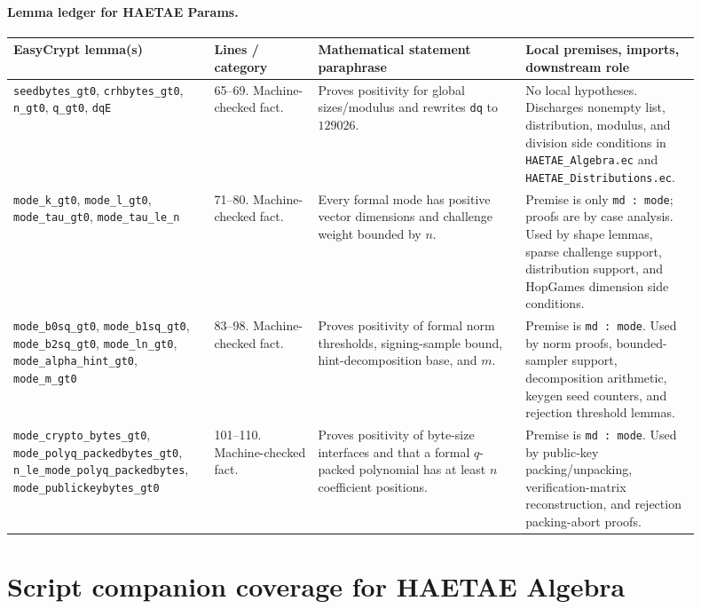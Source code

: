 \documentclass[11pt]{report}
\DeclareRobustCommand{\file}[1]{\ifmmode\text{\nolinkurl{#1}}\else\nolinkurl{#1}\fi}
\DeclareRobustCommand{\ec}[1]{\ifmmode\text{\nolinkurl{#1}}\else\nolinkurl{#1}\fi}
\theoremstyle{definition}
\theoremstyle{plain}
\begin{document}
\paragraph{Lemma ledger for HAETAE Params.}
{\footnotesize
\begin{longtable}{p{0.25\linewidth}p{0.14\linewidth}p{0.28\linewidth}p{0.23\linewidth}}
\toprule
\textbf{EasyCrypt lemma(s)} & \textbf{Lines / category} &
\textbf{Mathematical statement paraphrase} &
\textbf{Local premises, imports, downstream role} \\
\midrule
\ec{seedbytes\_gt0}, \ec{crhbytes\_gt0}, \ec{n\_gt0},
\ec{q\_gt0}, \ec{dqE} &
65--69. Machine-checked fact. &
Proves positivity for global sizes/modulus and rewrites \ec{dq} to
\(129026\). &
No local hypotheses.  Discharges nonempty list, distribution, modulus, and
division side conditions in \file{HAETAE\_Algebra.ec} and
\file{HAETAE\_Distributions.ec}. \\
\midrule
\ec{mode\_k\_gt0}, \ec{mode\_l\_gt0}, \ec{mode\_tau\_gt0},
\ec{mode\_tau\_le\_n} &
71--80. Machine-checked fact. &
Every formal mode has positive vector dimensions and challenge weight bounded
by \(n\). &
Premise is only \ec{md : mode}; proofs are by case analysis.  Used by shape
lemmas, sparse challenge support, distribution support, and HopGames
dimension side conditions. \\
\midrule
\ec{mode\_b0sq\_gt0}, \ec{mode\_b1sq\_gt0},
\ec{mode\_b2sq\_gt0}, \ec{mode\_ln\_gt0},
\ec{mode\_alpha\_hint\_gt0}, \ec{mode\_m\_gt0} &
83--98. Machine-checked fact. &
Proves positivity of formal norm thresholds, signing-sample bound,
hint-decomposition base, and \(m\). &
Premise is \ec{md : mode}.  Used by norm proofs, bounded-sampler support,
decomposition arithmetic, keygen seed counters, and rejection threshold
lemmas. \\
\midrule
\ec{mode\_crypto\_bytes\_gt0},
\ec{mode\_polyq\_packedbytes\_gt0},
\ec{n\_le\_mode\_polyq\_packedbytes},
\ec{mode\_publickeybytes\_gt0} &
101--110. Machine-checked fact. &
Proves positivity of byte-size interfaces and that a formal \(q\)-packed
polynomial has at least \(n\) coefficient positions. &
Premise is \ec{md : mode}.  Used by public-key packing/unpacking,
verification-matrix reconstruction, and rejection packing-abort proofs. \\
\bottomrule
\end{longtable}
}

\section{Script companion coverage for HAETAE Algebra}
\end{document}
